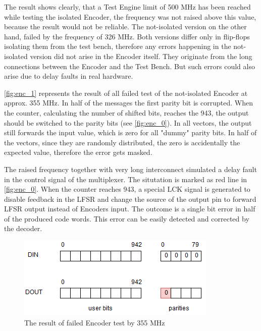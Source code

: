 The result shows clearly, that a Test Engine limit of 500 MHz has been reached while testing the isolated Encoder, the frequency was not raised above this value, because the result would not be reliable. The not-isolated version on the other hand, failed by the frequency of 326 MHz. Both versions differ only in flip-flops isolating them from the test bench, therefore any errors happening in the not-isolated version did not arise in the Encoder itself. They originate from the long connections between the Encoder and the Test Bench. But such errors could also arise due to delay faults in real hardware. 

\autoref{fig:enc_1} represents the result of all failed test of the not-isolated Encoder at approx. 355 MHz. In half of the messages the first parity bit is corrupted. When the counter, calculating the number of shifted bits, reaches the 943, the output should be switched to the parity bits (see \autoref{fig:enc_0}). In all vectors, the output still forwards the input value, which is zero for all "dummy" parity bits. In half of the vectors, since they are randomly distributed, the zero is accidentally the expected value, therefore the error gets masked.

The raised frequency together with very long interconnect simulated a delay fault in the control signal of the multiplexer. The situtation is marked as red line in \autoref{fig:enc_0}. When the counter reaches 943, a special LCK signal is generated to disable feedback in the LFSR and change the source of the output pin to forward LFSR output instead of Encoders input. The outcome is a single bit error in half of the produced code words. This error can be easily detected and corrected by the decoder.

\begin{figure}[h]
\centering
\includegraphics[width=.65\textwidth]{figures/enc_error.png}
\caption{The result of failed Encoder test by 355 MHz}
\label{fig:enc_1}
\end{figure}



